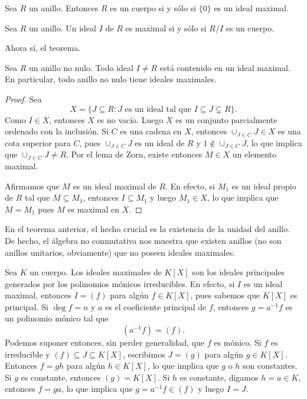 \begin{exercise}
Sea $R$ un anillo. Entonces $R$ es un cuerpo si y sólo si $\{0\}$ es un ideal maximal. 	
\end{exercise}

\begin{exercise}
Sea $R$ un anillo. Un ideal $I$ de $R$ es maximal si y sólo si $R/I$ es un cuerpo.
\end{exercise}

Ahora sí, el teorema.

\begin{theorem}
Sea $R$ un anillo no nulo. Todo ideal $I\ne R$ está contenido en un ideal maximal. 
En particular, todo anillo no nulo tiene ideales maximales. 
\end{theorem}

\begin{proof}
Sea 
\[
X=\{J\subseteq R:J\text{ es un ideal tal que }I\subseteq J\subsetneq R\}.
\]
Como $I\in X$, entonces $X$ es no vacío. Luego 
$X$ es un conjunto parcialmente ordenado con la inclusión. Si $C$ es una cadena en $X$, entonces $\cup_{J\in C}J\in X$
es una cota superior para $C$, pues $\cup_{J\in C}J$ es un ideal de $R$ y $1\not\in \cup_{J\in C}J$, lo que
implica que $\cup_{J\in C}J\ne R$. Por el lema de Zorn, existe entonces $M\in X$ un elemento maximal. 

Afirmamos que $M$ es un ideal maximal de $R$. En efecto, si $M_1$ es un ideal propio de $R$ tal que $M\subseteq M_1$, entonces
$I\subseteq M_1$ y luego $M_1\in X$, lo que implica que $M=M_1$ pues $M$ es maximal en $X$.   
\end{proof}

En el teorema anterior, el hecho crucial es la existencia de la unidad del anillo. 
De hecho, el álgebra no conmutativa nos muestra que existen anillos (no son anillos unitarios, obviamente) 
que no poseen ideales maximales.

\begin{example}
Sea $K$ un cuerpo. 
Los ideales maximales de $K[X]$ son los ideales principales generados por los polinomios mónicos irreducibles. En efecto,
si $I$ es un ideal maximal, entonces $I=(f)$ para algún $f\in K[X]$, pues sabemos que $K[X]$ es principal. Si $\deg f=n$ y 
$a$ es el coeficiente principal de $f$, entonces $g=a^{-1}f$ es un polinomio mónico tal que
\[
(a^{-1}f)=(f).
\] 
Podemos suponer entonces, sin perder generalidad, que $f$ es mónico. Si $f$ es irreducible y $(f)\subseteq J\subseteq K[X]$, escribimos
$J=(g)$ para algún $g\in K[X]$. Entonces $f=gh$ para algún $h\in K[X]$, lo que implica que $g$ o $h$ son constantes. Si $g$ es constante, 
entonces $(g)=K[X]$. Si $h$ es constante, digamos $h=a\in K$, entonces $f=ga$, lo que implica que $g=a^{-1}f\in (f)$ y luego $I=J$.   
\end{example}

